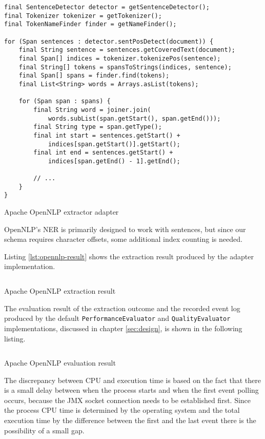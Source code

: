 \begin{listing}[H]
\begin{verbatim}
final SentenceDetector detector = getSentenceDetector();
final Tokenizer tokenizer = getTokenizer();
final TokenNameFinder finder = getNameFinder();

for (Span sentences : detector.sentPosDetect(document)) {
    final String sentence = sentences.getCoveredText(document);
    final Span[] indices = tokenizer.tokenizePos(sentence);
    final String[] tokens = spansToStrings(indices, sentence);
    final Span[] spans = finder.find(tokens);
    final List<String> words = Arrays.asList(tokens);

    for (Span span : spans) {
        final String word = joiner.join(
            words.subList(span.getStart(), span.getEnd()));
        final String type = span.getType();
        final int start = sentences.getStart() + 
            indices[span.getStart()].getStart();
        final int end = sentences.getStart() + 
            indices[span.getEnd() - 1].getEnd();

        // ...
    }
}
\end{verbatim}
\caption{Apache OpenNLP extractor adapter}
\label{lst:opennlp-adapter}
\end{listing}

OpenNLP's \gls{NER} is primarily designed to work with sentences, but since our schema requires character offsets, some additional index counting is needed.

Listing \ref{lst:opennlp-result} shows the extraction result produced by the adapter implementation.

\begin{listing}[H]
\inputminted{xml}{opennlp.xml}
\caption{Apache OpenNLP extraction result}
\label{lst:opennlp-result}
\end{listing}

The evaluation result of the extraction outcome and the recorded event log produced by the default \texttt{PerformanceEvaluator} and \texttt{QualityEvaluator} implementations, discussed in chapter \ref{sec:design}, is shown in the following listing.

\begin{listing}[H]
\inputminted{java}{opennlp.txt}
\caption{Apache OpenNLP evaluation result}
\label{lst:opennlp-eval-result}
\end{listing}

The discrepancy between CPU and execution time is based on the fact that there is a small delay between when the process starts and when the first event polling occurs, because the \gls{JMX} socket connection needs to be established first. Since the process CPU time is determined by the operating system and the total execution time by the difference between the first and the last event there is the possibility of a small gap.

